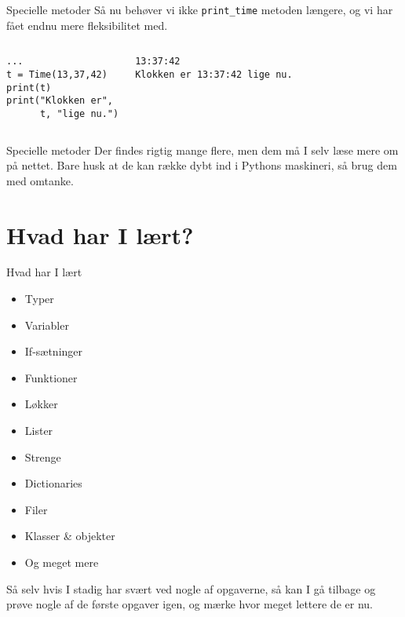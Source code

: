 \documentclass[main.tex]{subfiles}
\begin{document}
\begin{frame}[fragile]{Specielle metoder}
Så nu behøver vi ikke \texttt{print\_time} metoden længere, og vi har fået endnu mere fleksibilitet med.
\begin{columns}
\begin{lstlisting}[style=python]
...
t = Time(13,37,42)
print(t)
print("Klokken er", 
      t, "lige nu.")
\end{lstlisting}
\pause
{}
\begin{lstlisting}[style=python]
13:37:42
Klokken er 13:37:42 lige nu.
\end{lstlisting}
\end{columns}
\end{frame}

\begin{frame}[fragile]{Specielle metoder}
Der findes rigtig mange flere, men dem må I selv læse mere om på nettet. Bare husk at de kan række dybt ind i Pythons maskineri, så brug dem med omtanke.
\end{frame}
%
%

\section{Hvad har I lært?}


\begin{frame}[fragile]{Hvad har I lært}

\begin{itemize}
	\item Typer	
	\item Variabler 
	\item If-sætninger 
	\item Funktioner
	\item Løkker 
	\item Lister	
	\item Strenge	
	\item Dictionaries 
	\item Filer	
	\item Klasser \& objekter
	\item Og meget mere
\end{itemize}

\pause
Så selv hvis I stadig har svært ved nogle af opgaverne, så kan I gå tilbage og prøve nogle af de første opgaver igen, og mærke hvor meget lettere de er nu.

\end{frame}
\end{document}
